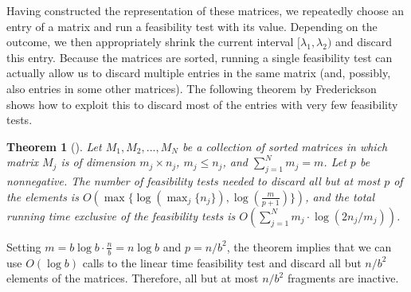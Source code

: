 \documentclass[11pt,a4paper]{article}
\newtheorem{theorem}{Theorem}[section]
\theoremstyle{definition}
\theoremstyle{remark}
\begin{document}
Having constructed the representation of these matrices, we repeatedly choose an entry of a matrix and run a feasibility test with its value.   
Depending on the outcome, we then appropriately shrink the current interval $[\lambda_{1},\lambda_{2})$ and discard this entry.
Because the matrices are sorted, running a single feasibility test can actually allow us to discard multiple entries in the same matrix
(and, possibly, also entries in some other matrices). The following theorem by Frederickson shows how to exploit this to discard most
of the entries with very few feasibility tests.

\begin{theorem}[\cite{Frederickson1991}]\label{Frederickson's theorem}
Let  ${M_1, M_2, . . . , M_N}$ be a collection of sorted matrices in which matrix $M_j$ is of dimension $m_j \times n_j$, $m_j \leq n_j$, and $\sum_{j=1}^{N} m_j = m$.
Let $p$ be nonnegative. The number of feasibility tests needed to discard all but at most $p$ of the elements is $O(\max \lbrace \log(\max_{j} \lbrace n_j \rbrace), \log(\frac{m}{p+1}) \rbrace)$, and the total running time exclusive of the feasibility tests is $O(\sum_{j=1}^{N} m_j \cdot \log (2n_j/m_j))$.
\end{theorem}

Setting $m=b \log b \cdot \frac{n}{b} = n \log b$ and $p=n/b^2$, the theorem implies that we can use $O(\log b)$ calls to the linear time feasibility test and discard all but $n/b^2$ elements of the matrices. Therefore, all but at most $n/b^{2}$ fragments are inactive.
\end{document}
